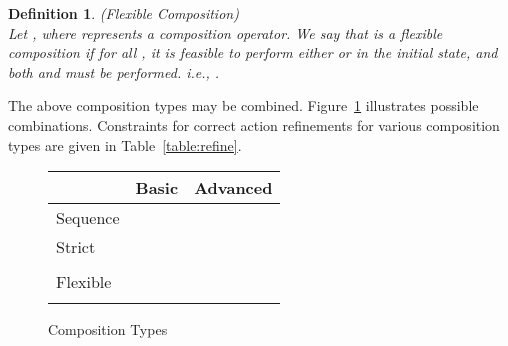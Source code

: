 \documentclass[12pt,journal,letterpaper,onecolumn]{IEEEtran}
\newtheorem{definition}{Definition}[section]
\begin{document}
\begin{definition}(Flexible Composition)\\
\label{def:flexible} Let , where
 represents a composition operator. We say that  is a flexible composition if for all , it is
feasible to perform {\em either}  or  in the initial
state, and both  and  must be performed. i.e., .
\end{definition}

The above composition types may be combined.
Figure~\ref{fig:compositionTypes} illustrates possible combinations.
Constraints for correct action refinements for various composition
types are given in Table~\ref{table:refine}.

\begin{figure}
\begin{minipage}{6in}
\footnotesize
\begin{center}
\begin{tabular}{|l|l|l|}
\hline
& Basic & Advanced \\
\hline
Sequence &  &  \\
\hline
 Strict &  &  \\
 &  & \\
\hline
Flexible &  &  \\
&  & \\
\hline
\end{tabular}
\end{center}
\normalsize
\end{minipage}
\caption{Composition Types} \label{fig:compositionTypes}

\end{figure}
\end{document}
